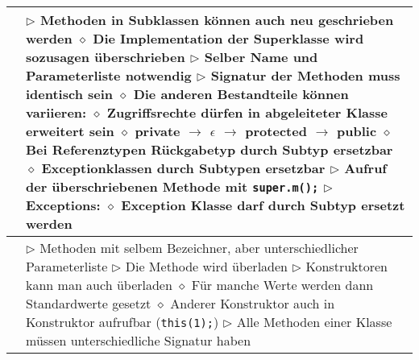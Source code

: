\begin{tabular}{ | p{4cm} p{13.5cm} | }
	\makecell[l]{Overwrite} & \makecell[l]{$\rhd$ Methoden in Subklassen können auch neu geschrieben werden \\
	\hspace{0.4cm} $\diamond$ Die Implementation der Superklasse wird sozusagen überschrieben \\
	$\rhd$ Selber Name und Parameterliste notwendig \\
	$\rhd$ Signatur der Methoden muss identisch sein \\
	\hspace{0.4cm} $\diamond$ Die anderen Bestandteile können variieren: \\
	\hspace{0.4cm} $\diamond$ Zugriffsrechte dürfen in abgeleiteter Klasse erweitert sein \\
	\hspace{0.4cm} $\diamond$ private $\rightarrow$ $\epsilon$ $\rightarrow$ protected $\rightarrow$ public \\
	\hspace{0.4cm} $\diamond$ Bei Referenztypen Rückgabetyp durch Subtyp ersetzbar \\
	\hspace{0.4cm} $\diamond$ Exceptionklassen durch Subtypen ersetzbar \\
	$\rhd$ Aufruf der überschriebenen Methode mit \texttt{super.m();} \\
	$\rhd$ Exceptions: \\
	\hspace{0.4cm} $\diamond$ Exception Klasse darf durch Subtyp ersetzt werden} \\ \hline
	
	\makecell[l]{Overload} & 
	\makecell[l]{$\rhd$ Methoden mit selbem Bezeichner, aber unterschiedlicher Parameterliste \\
	$\rhd$ Die Methode wird überladen \\ 
	$\rhd$ Konstruktoren kann man auch überladen \\
	\hspace{0.4cm} $\diamond$ Für manche Werte werden dann Standardwerte gesetzt \\
	\hspace{0.4cm} $\diamond$ Anderer Konstruktor auch in Konstruktor aufrufbar (\texttt{this(1);}) \\
	$\rhd$ Alle Methoden einer Klasse müssen unterschiedliche Signatur haben } \\ \hline
		

\end{tabular}
